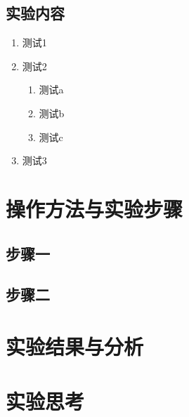 \documentclass[a4paper,12pt]{article}
\begin{document}
\subsection{实验内容}
\begin{enumerate}
\item 测试1
\item 测试2
	\begin{enumerate}
	\item 测试a
	\item 测试b
	\item 测试c
	\end{enumerate}
\item 测试3
\end{enumerate}


\section{操作方法与实验步骤}
\subsection{步骤一}

\subsection{步骤二}


\section{实验结果与分析}


\section{实验思考}
\end{document}
